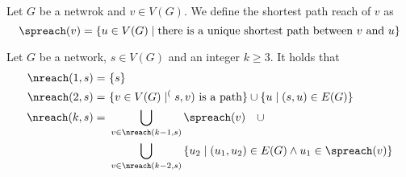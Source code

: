 \begin{definition}
Let $G$ be a netwrok and $v \in V(G)$. We define the shortest path reach of $v$ as
$$
\spreach(v) = \left\{ u \in V(G) \mid \textrm{there is a unique shortest path between $v$ and $u$} \right\}
$$
\end{definition}


\begin{theorem}
\label{thm:nreach}
Let $G$ be a network, $s \in V(G)$ and an integer $k \geq 3$. It holds that
\begin{align*}
\nreach(1, s) = & \ \{ s \} \\
\nreach(2, s) = & \ \{ v \in V(G) \mid  \sp(s, v) \textrm{ is a path} \} \cup \{ u \mid (s, u) \in E(G) \} \\
\nreach(k, s) = & \ \bigcup_{v \in \nreach(k - 1, s)} \spreach(v) \quad \cup \\ 
& \ \bigcup_{v \in \nreach(k - 2, s)}  \left\{ u_2 \mid (u_1, u_2) \in E(G) \wedge u_1 \in \spreach(v) \right\}
\end{align*}
\end{theorem}

